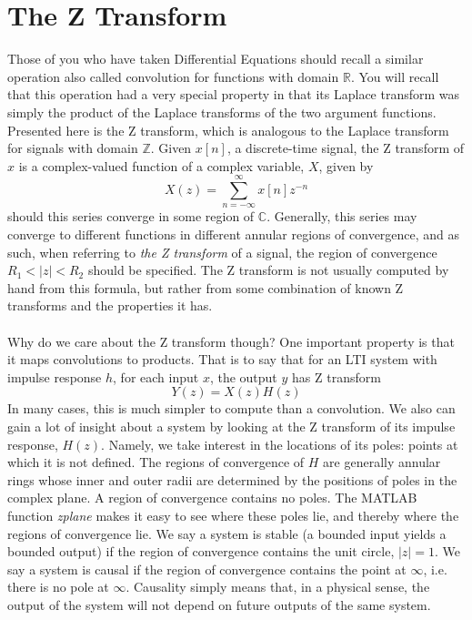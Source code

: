 \documentclass{article}
\begin{document}
\section*{The Z Transform}
Those of you who have taken Differential Equations should recall a similar operation also called convolution for functions with domain 
$\mathbb{R}$. You will recall that this operation had a very special property in that its Laplace transform was simply the product of 
the Laplace transforms of the two argument functions. Presented here is the Z transform, which is analogous to the Laplace transform 
for signals with domain $\mathbb{Z}$. Given $x[n]$, a discrete-time signal, the Z transform of $x$ is a complex-valued function of 
a complex variable, $X$, given by 
$$X(z) = \sum_{n=-\infty}^{\infty}x[n]z^{-n}$$
should this series converge in some region of $\mathbb{C}$. Generally, this series may converge to different functions in different 
annular regions of convergence, and as such, when referring to \textit{the Z transform} of a signal, the region of convergence 
$R_1 < |z| < R_2$ should be specified. The Z transform is not usually computed by hand from this formula, but rather from some 
combination of known Z transforms and the properties it has. \\ \\
\noindent Why do we care about the Z transform though? One important property is that it maps convolutions to products. That is to say 
that for an LTI system with impulse response $h$, for each input $x$, the output $y$ has Z transform
$$Y(z) = X(z)H(z)$$
In many cases, this is much simpler to compute than a convolution. We also can gain a lot of insight about a system by looking at 
the Z transform of its impulse response, $H(z)$. Namely, we take interest in the locations of its poles: points at which it is not 
defined. The regions of convergence of $H$ are generally annular rings whose inner and outer radii are determined by the positions 
of poles in the complex plane. A region of convergence contains no poles. The MATLAB function \textit{zplane} makes it easy to see 
where these poles lie, and thereby where the regions of convergence lie. We say a system is stable (a bounded input yields a bounded 
output) if the region of convergence contains the unit circle, $|z| = 1$. We say a system is causal if the region of convergence 
contains the point at $\infty$, i.e. there is no pole at $\infty$. Causality simply means that, in a physical sense, the output of 
the system will not depend on future outputs of the same system.
\end{document}
